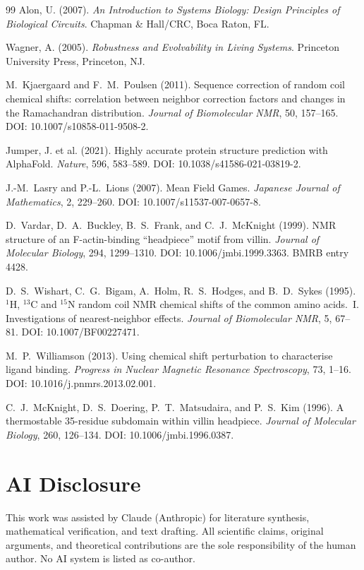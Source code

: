 \documentclass[12pt,a4paper]{article}
\theoremstyle{remark}
\begin{document}
\begin{thebibliography}{99}
Alon, U. (2007).
\newblock \textit{An Introduction to Systems Biology: Design Principles of Biological Circuits}.
\newblock Chapman \& Hall/CRC, Boca Raton, FL.

Wagner, A. (2005).
\newblock \textit{Robustness and Evolvability in Living Systems}.
\newblock Princeton University Press, Princeton, NJ.

M.~Kjaergaard and F.~M.~Poulsen (2011).
\newblock Sequence correction of random coil chemical shifts: correlation between neighbor correction factors and changes in the Ramachandran distribution.
\newblock \textit{Journal of Biomolecular NMR}, 50, 157--165.
\newblock DOI: 10.1007/s10858-011-9508-2.

Jumper, J. et al. (2021).
\newblock Highly accurate protein structure prediction with AlphaFold.
\newblock \textit{Nature}, 596, 583--589.
\newblock DOI: 10.1038/s41586-021-03819-2.

J.-M.~Lasry and P.-L.~Lions (2007).
\newblock Mean Field Games.
\newblock \textit{Japanese Journal of Mathematics}, 2, 229--260.
\newblock DOI: 10.1007/s11537-007-0657-8.

D.~Vardar, D.~A.~Buckley, B.~S.~Frank, and C.~J.~McKnight (1999).
\newblock NMR structure of an F-actin-binding ``headpiece'' motif from villin.
\newblock \textit{Journal of Molecular Biology}, 294, 1299--1310.
\newblock DOI: 10.1006/jmbi.1999.3363.
\newblock BMRB entry 4428.

D.~S.~Wishart, C.~G.~Bigam, A.~Holm, R.~S.~Hodges, and B.~D.~Sykes (1995).
\newblock $^1$H, $^{13}$C and $^{15}$N random coil NMR chemical shifts of the common amino acids.~I. Investigations of nearest-neighbor effects.
\newblock \textit{Journal of Biomolecular NMR}, 5, 67--81.
\newblock DOI: 10.1007/BF00227471.

M.~P.~Williamson (2013).
\newblock Using chemical shift perturbation to characterise ligand binding.
\newblock \textit{Progress in Nuclear Magnetic Resonance Spectroscopy}, 73, 1--16.
\newblock DOI: 10.1016/j.pnmrs.2013.02.001.

C.~J.~McKnight, D.~S.~Doering, P.~T.~Matsudaira, and P.~S.~Kim (1996).
\newblock A thermostable 35-residue subdomain within villin headpiece.
\newblock \textit{Journal of Molecular Biology}, 260, 126--134.
\newblock DOI: 10.1006/jmbi.1996.0387.

\end{thebibliography}

\section*{AI Disclosure}
This work was assisted by Claude (Anthropic) for literature synthesis, mathematical verification, and text drafting. All scientific claims, original arguments, and theoretical contributions are the sole responsibility of the human author. No AI system is listed as co-author.
\end{document}
